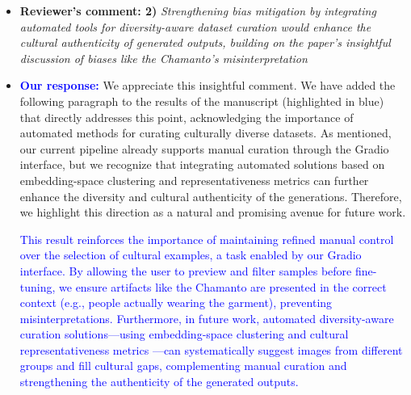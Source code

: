 \documentclass[11pt]{article}
\begin{document}
\begin{itemize}
\textbf{Fine-tuning:} Alongside the advancements in large-scale architectures, fine-tuning techniques have gained prominence for adapting text-to-image models to specific domains or personalized subjects. DreamBooth \cite{dreambooth} and Textual Inversion \cite{textualinversion} are particularly effective in few-shot scenarios, enabling personalized generation from very limited samples. New approaches such as Specialist Diffusion \cite{Specialist-Diffusion} and Object-Driven One-Shot Fine-Tuning with Prototypical Embedding \cite{lu2024object} aim to further reduce overfitting and improve fidelity. These methods facilitate adaptation to novel objects, styles, and even cultural elements via specialized fine-tuning strategies. \textcolor{blue}{In Large Language Models (LLMs), APROMPT \cite{wang2023aprompt} introduces trainable query, key, and value prompts directly into the attention mechanism—beyond traditional input-level prompt tuning—enabling efficient and highly effective fine-tuning with fewer parameters.}


\color{black}
\item {\bf Reviewer's comment: 2)}{\it
Strengthening bias mitigation by integrating automated tools for diversity-aware dataset curation would enhance the cultural authenticity of generated outputs, building on the paper's insightful discussion of biases like the Chamanto's misinterpretation}

\item {\bf \textcolor{blue}{Our response:}} We appreciate this insightful comment. We have added the following paragraph to the results of the manuscript (highlighted in blue) that directly addresses this point, acknowledging the importance of automated methods for curating culturally diverse datasets. As mentioned, our current pipeline already supports manual curation through the Gradio interface, but we recognize that integrating automated solutions based on embedding-space clustering and representativeness metrics can further enhance the diversity and cultural authenticity of the generations. Therefore, we highlight this direction as a natural and promising avenue for future work.

\textcolor{blue}{This result reinforces the importance of maintaining refined manual control over the selection of cultural examples, a task enabled by our Gradio interface. By allowing the user to preview and filter samples before fine-tuning, we ensure artifacts like the Chamanto are presented in the correct context (e.g., people actually wearing the garment), preventing misinterpretations. Furthermore, in future work, automated diversity-aware curation solutions—using embedding-space clustering and cultural representativeness metrics \cite{luccioni2023stablebiasanalyzingsocietal}—can systematically suggest images from different groups and fill cultural gaps, complementing manual curation and strengthening the authenticity of the generated outputs.}



\end{itemize}
\end{document}
